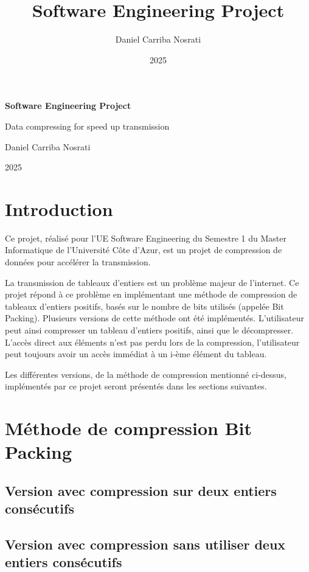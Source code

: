 \documentclass[titlepage]{article}
\title{Software Engineering Project}
\author{Daniel \sc Carriba Nosrati}
\date{2025}
\begin{document}
\begin{titlepage}
    \centering
    \vspace*{\fill} 
    {\Huge \bfseries Software Engineering Project \par}
    \vspace{1cm}
    {\Large Data compressing for speed up transmission \par}
    \vfill
    {\large Daniel \sc Carriba Nosrati \par}
    \vspace{0.5cm}
    {\large 2025 \par}
    \vspace*{\fill} 
\end{titlepage}

\tableofcontents

\clearpage

\section{Introduction}

Ce projet, réalisé pour l'UE Software Engineering du Semestre 1 du Master Informatique de l'Université Côte d'Azur, est un projet de compression de données pour accélérer la transmission. 
\par La transmission de tableaux d'entiers est un problème majeur de l'internet. Ce projet répond à ce problème en implémentant une méthode de compression de tableaux d'entiers positifs, basés sur le nombre de bits utilisés (appelée Bit Packing). Plusieurs versions de cette méthode ont été implémentés. L'utilisateur peut ainsi compresser un tableau d'entiers positifs, ainsi que le décompresser. L'accès direct aux éléments n'est pas perdu lors de la compression, l'utilisateur peut toujours avoir un accès immédiat à un i-ème élément du tableau.
\par Les différentes versions, de la méthode de compression mentionné ci-dessus, implémentés par ce projet seront présentés dans les sections suivantes.

\clearpage

\section{Méthode de compression Bit Packing}

\subsection{Version avec compression sur deux entiers consécutifs}

\subsection{Version avec compression sans utiliser deux entiers consécutifs}
\end{document}
